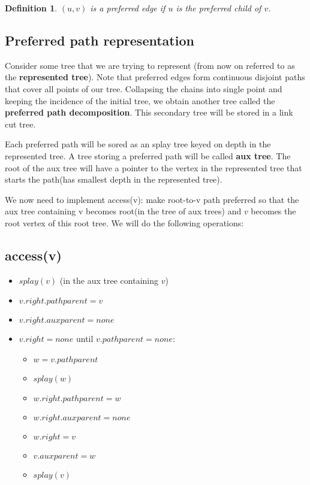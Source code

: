 \documentclass[11pt]{article}
\newtheorem{defn}{Definition}
\begin{document}
\begin{defn}
	$(u,v)$ is a preferred edge if $u$ is the preferred child of $v$.
\end{defn} 
\subsection{Preferred path representation}

Consider some tree that we are trying to represent (from now on referred to as the {\bf represented tree}). Note that preferred edges form continuous disjoint paths that cover all points of our tree. Collapsing the chains into single point and keeping the incidence of the initial tree, we obtain another tree called the {\bf preferred path decomposition}. This secondary tree will  be stored in a link cut tree. 

Each preferred path will be sored as an splay tree keyed on depth in the represented tree. A tree  storing a preferred path will be called {\bf aux tree}. The root of the aux tree will have a pointer to the vertex in the represented tree that starts the path(has smallest depth in the represented tree).

We now need to implement access(v): make root-to-v path preferred so that the aux tree containing v becomes root(in the tree of aux trees) and $v$ becomes the root vertex of this root tree. We will do the following operations:

\subsection{access(v)}
\begin{itemize}
	\item $splay(v)$ (in the aux tree containing $v$)
	\item $v.right.pathparent=v$ 
	\item $v.right.auxparent=none$ 
	\item $v.right=none$
	until $v.pathparent=none$:
	\begin{itemize}
		\item $w=v.pathparent$
		\item $splay(w)$
		\item $w.right.pathparent=w$
		\item $w.right.auxparent=none$
		\item $w.right=v$
		\item $v.auxparent=w$
		\item $splay(v)$
	\end{itemize}	
\end{itemize}
\end{document}
